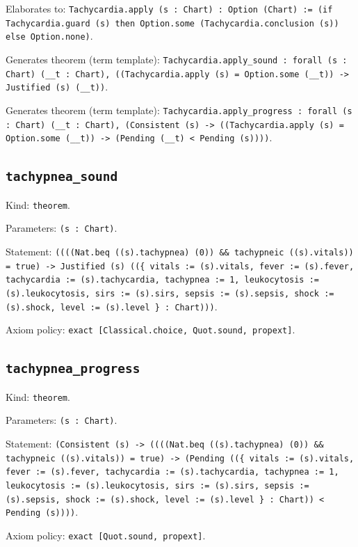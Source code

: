 \documentclass[11pt]{article}
\begin{document}
\noindent Elaborates to: \texttt{Tachycardia.apply (s : Chart) : Option (Chart) := (if Tachycardia.guard (s) then Option.some (Tachycardia.conclusion (s)) else Option.none)}.\par
\noindent Generates theorem (term template): \texttt{Tachycardia.apply\_sound : forall (s : Chart) (\_\_t : Chart), ((Tachycardia.apply (s) = Option.some (\_\_t)) -> Justified (s) (\_\_t))}.\par
\noindent Generates theorem (term template): \texttt{Tachycardia.apply\_progress : forall (s : Chart) (\_\_t : Chart), (Consistent (s) -> ((Tachycardia.apply (s) = Option.some (\_\_t)) -> (Pending (\_\_t) < Pending (s))))}.\par
\subsection*{\texttt{tachypnea\_sound}}
\noindent Kind: \texttt{theorem}.\par
\noindent Parameters: \texttt{(s : Chart)}.\par
\noindent Statement: \texttt{((((Nat.beq ((s).tachypnea) (0)) \&\& tachypneic ((s).vitals)) = true) -> Justified (s) ((\{ vitals := (s).vitals, fever := (s).fever, tachycardia := (s).tachycardia, tachypnea := 1, leukocytosis := (s).leukocytosis, sirs := (s).sirs, sepsis := (s).sepsis, shock := (s).shock, level := (s).level \} : Chart)))}.\par
\noindent Axiom policy: \texttt{exact [Classical.choice, Quot.sound, propext]}.\par
\subsection*{\texttt{tachypnea\_progress}}
\noindent Kind: \texttt{theorem}.\par
\noindent Parameters: \texttt{(s : Chart)}.\par
\noindent Statement: \texttt{(Consistent (s) -> ((((Nat.beq ((s).tachypnea) (0)) \&\& tachypneic ((s).vitals)) = true) -> (Pending ((\{ vitals := (s).vitals, fever := (s).fever, tachycardia := (s).tachycardia, tachypnea := 1, leukocytosis := (s).leukocytosis, sirs := (s).sirs, sepsis := (s).sepsis, shock := (s).shock, level := (s).level \} : Chart)) < Pending (s))))}.\par
\noindent Axiom policy: \texttt{exact [Quot.sound, propext]}.\par
\end{document}
